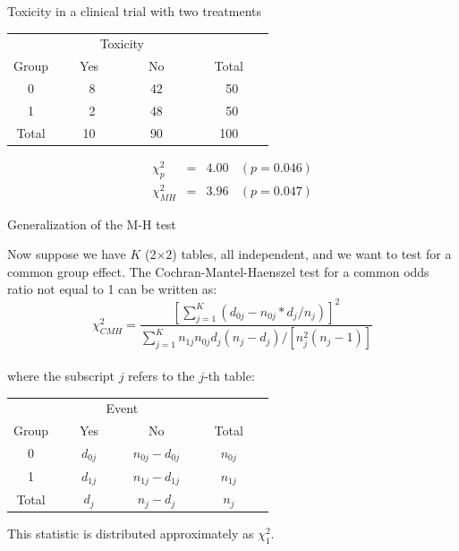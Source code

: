 \documentclass[envcountsect, 10pt, portrait, palatino]{beamer}
\begin{document}
\begin{frame}{ Toxicity in a clinical trial with two treatments}

\begin{center}
\begin{tabular}{cccc}
\hline \hline
& \multicolumn{2}{c}{Toxicity}   \\ \cline{2-3}
\multicolumn{1}{c}{Group } & ~~~Yes~~~ & ~~~No~~~ & ~~~Total~~~ \\ \hline
0 &  ~8    & 42  &  ~50       \\
1 &  ~2   &  48 &   ~50        \\
\hline
Total & 10 & 90 &  100        \\ \hline \hline
\end{tabular}
\end{center}

\begin{eqnarray*}
\chi_p^2 & = & 4.00 ~~~~ (p=0.046)\\[3ex]
\chi_{MH}^2 & = & 3.96 ~~~~ (p=0.047)
\end{eqnarray*}
\end{frame}
\begin{frame}{Generalization of the M-H test}

Now suppose we have $K$ (2$\times 2$) tables, all independent, and we
want to test for a common group effect. The Cochran-Mantel-Haenszel
test for a common odds ratio not equal to 1 can be written as:
\\[2ex]
\[  \chi^2_{CMH} =   \frac{[\sum_{j=1}^K (d_{0j} - n_{0j}*d_j/n_j)]^2}
        {\sum_{j=1}^K n_{1j} n_{0j} d_j (n_j-d_j)/[n_j^2(n_j-1)]}  \]
\\[2ex]
where the subscript $j$ refers to the $j$-th table:

\begin{center}
\begin{tabular}{cccc}
\hline \hline
& \multicolumn{2}{c}{Event} & \\ \cline{2-3}
\multicolumn{1}{c}{Group } & ~~~Yes~~~ & ~~~No~~~ & ~~~Total~~~\\ \hline
0 & $d_{0j}$ & $n_{0j} - d_{0j}$ & $n_{0j}$  \\
1 & $d_{1j}$ & $n_{1j} - d_{1j}$ & $n_{1j}$ \\
\hline
Total &  $d_j  $ & $n_j - d_j  $ & $n_j  $  \\ \hline \hline
\end{tabular}
\end{center}
This statistic is distributed approximately as $\chi^2_1$.
\end{frame}
\end{document}
